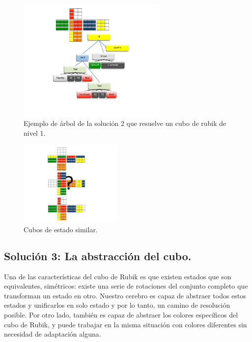 \begin{figure}[t]
\centering
\includegraphics[width=0.65\textwidth]{figs/pdf/leng2ejem1}
\caption{Ejemplo de árbol de la solución 2 que resuelve un cubo de rubik de
nivel 1.}
\label{fig:leng2ejem1}
\end{figure}

\begin{figure}[t]
\centering
\includegraphics[width=0.45\textwidth]{figs/pdf/leng2ejem2}
\caption{Cubos de estado similar.}
\label{fig:leng2ejem2}
\end{figure}

\clearpage


\subsection{Solución 3: La abstracción del cubo.}\label{subsec:solucion3}

Una de las características del cubo de Rubik es que existen estados que son
equivalentes, simétricos: existe una serie de rotaciones del conjunto completo
que transforman un estado en otro. Nuestro cerebro es capaz de abstraer todos
estos estados y unificarlos en solo estado y por lo tanto, un camino de
resolución posible. Por otro lado, también es capaz de abstraer los colores
específicos del cubo de Rubik, y puede trabajar en la misma situación con colores
diferentes sin necesidad de adaptación alguna.

